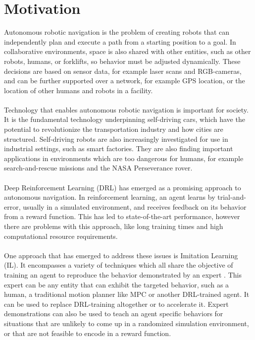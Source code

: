 \section{Motivation}
Autonomous robotic navigation is the problem of creating robots that can independently plan and execute a path from a starting position to a goal. In collaborative environments, space is also shared with other entities, such as other robots, humans, or forklifts, so behavior must be adjusted dynamically. These decisions are based on sensor data, for example laser scans and RGB-cameras, and can be further supported over a network, for example GPS location, or the location of other humans and robots in a facility.
\\\\\noindent 
Technology that enables autonomous robotic navigation is important for society. It is the fundamental technology underpinning self-driving cars, which have the potential to revolutionize the transportation industry and how cities are structured. Self-driving robots are also increasingly investigated for use in industrial settings, such as smart factories. They are also finding important applications in environments which are too dangerous for humans, for example search-and-rescue missions and the NASA Perseverance rover.
\\\\\noindent 
Deep Reinforcement Learning (DRL) has emerged as a promising approach to autonomous navigation. In reinforcement learning, an agent learns by trial-and-error, usually in a simulated environment, and receives feedback on its behavior from a reward function. This has led to state-of-the-art performance, however there are problems with this approach, like long training times and high computational resource requirements.
\\\\\noindent 
One approach that has emerged to address these issues is Imitation Learning (IL). It encompasses a variety of techniques which all share the objective of training an agent to reproduce the behavior demonstrated by an expert \citep{abbeel}. This expert can be any entity that can exhibit the targeted behavior, such as a human, a traditional motion planner like MPC or another DRL-trained agent. It can be used to replace DRL-training altogether or to accelerate it. Expert demonstrations can also be used to teach an agent specific behaviors for situations that are unlikely to come up in a randomized simulation environment, or that are not feasible to encode in a reward function.
